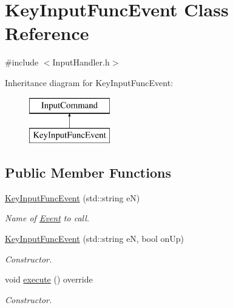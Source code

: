 \hypertarget{class_key_input_func_event}{\section{Key\+Input\+Func\+Event Class Reference}
\label{class_key_input_func_event}
}


{\ttfamily \#include $<$Input\+Handler.\+h$>$}

Inheritance diagram for Key\+Input\+Func\+Event\+:\begin{figure}[H]
\begin{center}
\leavevmode
\includegraphics[height=2.000000cm]{class_key_input_func_event}
\end{center}
\end{figure}
\subsection*{Public Member Functions}
\begin{DoxyCompactItemize}
\item 
\hypertarget{class_key_input_func_event_a91cc8f1399b3ecfbd58e62d82629ab89}{\hyperlink{class_key_input_func_event_a91cc8f1399b3ecfbd58e62d82629ab89}{Key\+Input\+Func\+Event} (std\+::string e\+N)}\label{class_key_input_func_event_a91cc8f1399b3ecfbd58e62d82629ab89}

\begin{DoxyCompactList}\small\item\em Name of \hyperlink{class_event}{Event} to call. \end{DoxyCompactList}\item 
\hypertarget{class_key_input_func_event_a7bfef1504d75dae97025d722640a10b1}{\hyperlink{class_key_input_func_event_a7bfef1504d75dae97025d722640a10b1}{Key\+Input\+Func\+Event} (std\+::string e\+N, bool on\+Up)}\label{class_key_input_func_event_a7bfef1504d75dae97025d722640a10b1}

\begin{DoxyCompactList}\small\item\em Constructor. \end{DoxyCompactList}\item 
void \hyperlink{class_key_input_func_event_af426cca105b31799f0fb3fd3716c37fb}{execute} () override
\begin{DoxyCompactList}\small\item\em Constructor. \end{DoxyCompactList}\end{DoxyCompactItemize}
